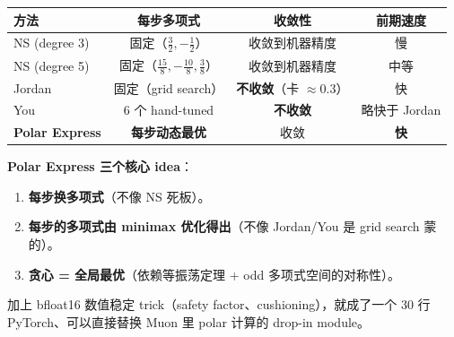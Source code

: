 \documentclass[11pt]{article}
\begin{document}
\begin{center}
\begin{tabular}{|l|c|c|c|}
\hline
方法 & 每步多项式 & 收敛性 & 前期速度 \\
\hline
NS (degree 3) & 固定（$\frac{3}{2}, -\frac{1}{2}$） & 收敛到机器精度 & 慢 \\
NS (degree 5) & 固定（$\frac{15}{8}, -\frac{10}{8}, \frac{3}{8}$） & 收敛到机器精度 & 中等 \\
Jordan & 固定（grid search） & \textbf{不收敛}（卡 $\approx 0.3$） & 快 \\
You & 6 个 hand-tuned & \textbf{不收敛} & 略快于 Jordan \\
\textbf{Polar Express} & \textbf{每步动态最优} & 收敛 & \textbf{快} \\
\hline
\end{tabular}
\end{center}

\textbf{Polar Express 三个核心 idea}：
\begin{enumerate}
\item \textbf{每步换多项式}（不像 NS 死板）。
\item \textbf{每步的多项式由 minimax 优化得出}（不像 Jordan/You 是 grid search 蒙的）。
\item \textbf{贪心 = 全局最优}（依赖等振荡定理 + odd 多项式空间的对称性）。
\end{enumerate}

加上 bfloat16 数值稳定 trick（safety factor、cushioning），就成了一个 30 行 PyTorch、可以直接替换 Muon 里 polar 计算的 drop-in module。
\end{document}
